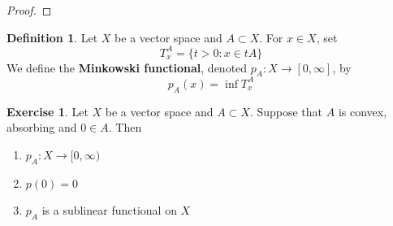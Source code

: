 \documentclass[12pt]{amsart}
\theoremstyle{definition}
\newtheorem{defn}[definition]{Definition}
\newtheorem{ex}[definition]{Exercise}
\newcommand{\tbf}[1]{\textbf{#1}}
\newcommand{\RG}{[0,\infty]}
\newcommand{\Rg}{[0,\infty)}
\DeclareMathOperator*{\0}{\mbf{0}}
\DeclareMathOperator*{\1}{\mbf{1}}
\begin{document}
	\begin{proof}
		
	\end{proof}

	\begin{defn}
		Let $X$ be a vector space and $A \subset X$. For $x \in X$, set $$T^A_x = \{t > 0: x \in tA\}$$ We define the \tbf{Minkowski functional}, denoted $p_A: X \rightarrow \RG$, by $$p_A(x) = \inf T^A_x$$ 
	\end{defn}

	\begin{ex}
		Let $X$ be a vector space and $A \subset X$. Suppose that $A$ is convex, absorbing and $0 \in A$. Then 
		\begin{enumerate}
			\item $p_A:X \rightarrow \Rg$ 
			\item $p(0) = 0$
			\item $p_A$ is a sublinear functional on $X$
		\end{enumerate}
	\end{ex}
\end{document}
